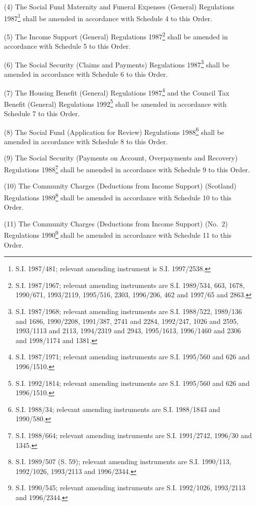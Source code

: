 \documentclass[12pt,a4paper]{article}
\begin{document}
(4) The Social Fund Maternity and Funeral Expenses (General) Regulations 1987\footnote{\frenchspacing S.I. 1987/481; relevant amending instrument is S.I. 1997/2538.} shall be amended in accordance with Schedule 4 to this Order.

(5) The Income Support (General) Regulations 1987\footnote{\frenchspacing S.I. 1987/1967; relevant amending instruments are S.I. 1989/534, 663, 1678, 1990/671, 1993/2119, 1995/516, 2303, 1996/206, 462 and 1997/65 and 2863.} shall be amended in accordance with Schedule 5 to this Order.

(6) The Social Security (Claims and Payments) Regulations 1987\footnote{\frenchspacing S.I. 1987/1968; relevant amending instruments are S.I. 1988/522, 1989/136 and 1686, 1990/2208, 1991/387, 2741 and 2284, 1992/247, 1026 and 2595, 1993/1113 and 2113, 1994/2319 and 2943, 1995/1613, 1996/1460 and 2306 and 1998/1174 and 1381.} shall be amended in accordance with Schedule 6 to this Order.

(7) The Housing Benefit (General) Regulations 1987\footnote{\frenchspacing S.I. 1987/1971; relevant amending instruments are S.I. 1995/560 and 626 and 1996/1510.} and the Council Tax Benefit (General) Regulations 1992\footnote{\frenchspacing S.I. 1992/1814; relevant amending instruments are S.I. 1995/560 and 626 and 1996/1510.} shall be amended in accordance with Schedule 7 to this Order.

(8) The Social Fund (Application for Review) Regulations 1988\footnote{\frenchspacing S.I. 1988/34; relevant amending instruments are S.I. 1988/1843 and 1990/580.} shall be amended in accordance with Schedule 8 to this Order.

(9) The Social Security (Payments on Account, Overpayments and Recovery) Regulations 1988\footnote{\frenchspacing S.I. 1988/664; relevant amending instruments are S.I. 1991/2742, 1996/30 and 1345.} shall be amended in accordance with Schedule 9 to this Order.

(10) The Community Charges (Deductions from Income Support) (Scotland) Regulations 1989\footnote{\frenchspacing S.I. 1989/507 (S. 59); relevant amending instruments are S.I. 1990/113, 1992/1026, 1993/2113 and 1996/2344.} shall be amended in accordance with Schedule 10 to this Order.

(11) The Community Charges (Deductions from Income Support) (No.\ 2) Regulations 1990\footnote{\frenchspacing S.I. 1990/545; relevant amending instruments are S.I. 1992/1026, 1993/2113 and 1996/2344.} shall be amended in accordance with Schedule 11 to this Order.
\end{document}
